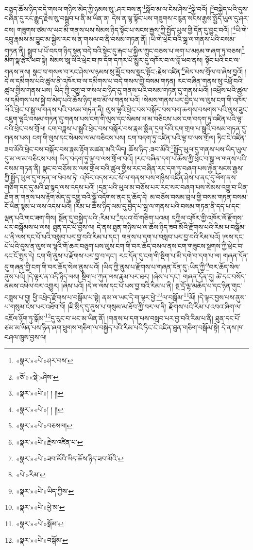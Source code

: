 བཅུད་ཆོས་ཉིད་བདེ་གསལ་གཉིས་མེད་ཀྱི་ཉམས་སུ་:ཤར་བས་ན་\footnote{«སྣར་»«པེ་»ཤར་བས་}སློབ་མ་ལ་ངེས་ཤེས་\footnote{«ཅོ་»«སྡེ་»ཤིས་}སྐྱེ་བའོ། །\footnote{«སྣར་»«པེ་»། ། །།}བསྐྱེད་པའི་དུས་བཞིན་དུ་རང་རྒྱུད་རྗེས་སུ་བསྒྲུབ་པ་ནི་མ་ཡིན་ན། དེས་ན་ལྷ་སྟོང་པས་གཟུགས་བརྙན་སངས་རྒྱས་སྤྱོད་ཡུལ་དུ་ཤར་བས། གཟུགས་ཙམ་ལ་ཡང་མི་གནས་པས་སེམས་ཉིད་སྟོང་པ་སངས་རྒྱས་ཀྱི་སྤྱོད་ཡུལ་གྱི་དོན་དུ་བྱུང་བའོ། །\footnote{«སྣར་»«པེ་»། ། །།}ཡི་གེ་འབྲུ་རྣམས་མ་བྱུང་མ་སྐྱེས་རང་ས་ན་གསལ་བ་ནི་བསམ་གཏན་ནོ། །ཡི་གེ་ཕྲེང་བའི་སྒྲ་ལ་གནས་པའི་བསམ་གཏན་ནི། སྒྲུབ་པ་པོ་བདག་ཉིད་སྟན་བདེ་བའི་སྟེང་དུ་རྐང་པ་སྐྱིལ་ཀྲུང་བཅས་པ་ལག་པ་མཉམ་གཞག་ཏུ་བཅས།\footnote{«སྣར་»«པེ་»བཅསལ།} མིག་སྣ་རྩེར་ཕབ་སྟེ། སེམས་ཨཱ་ལིའི་ཕྲེང་བ་ཁ་དོག་དཀར་པོ་མྱུར་དུ་འཁོར་བ་ལ་བློ་ཕབ་ནས། སྟོང་པའི་ངང་ལ་གནས་ནས། སྣང་བ་གསལ་བ་རང་ཤེས་ལ་ཉམས་སུ་མྱོང་བས་སྣང་སྟོང་:རྗེས་འཛིན་\footnote{«སྣར་»«པེ་»རྗེས་འཛིན་པ་}མེད་པས་གྲོལ་བ་ཞེས་བྱའོ། །དེ་ལ་དམིགས་པའི་ཚུལ་ནི་འཁོར་བ་ལ་དམིགས་པ་བདེ་གསལ་གྱི་བསམ་གཏན། རང་བཞིན་གནས་སུ་འཕྲོ་བའི་ཚུལ་གྱིས་གནས་པས། ཡིད་ཀྱི་འགྱུ་བ་གསལ་བ་ཉིད་དུ་གནས་པའི་བསམ་གཏན་དུ་གནས་པའོ། །འཕྲོས་པའི་ཚུལ་ལ་དམིགས་པས་སྐྱེ་བ་མེད་པའི་ཆོས་ཉིད་ཟབ་མོ་ལ་གནས་པའོ། །སེམས་གནས་པར་བྱེད་པ་ལ་ལུས་ངག་གི་འཁོར་ལོའི་ཕྲེང་བ་སྒྲ་ལ་གནས་པའི་བསམ་གཏན་ནི། ལུས་ལྷའི་ཕྲེང་བས་བསྐོར་བས་བག་ཆགས་བསགས་པའི་ལུས་ཟུང་འཇུག་ལྷའི་བསམ་གཏན་དུ་གནས་པས་ངག་གི་ལུས་དང་སེམས་ལ་མ་བཅིངས་པས་ངག་བདག་ཏུ་འཛིན་པའི་ལྟ་བའི་ཕྲེང་བས་གྲོལ། ངག་བཟླས་པ་སྒྲའི་ཕྲེང་བས་བསྐོར་བས་རྣམ་སྨིན་དྲག་པོའི་ངག་གྲག་པ་སྒྲའི་བསམ་གཏན་དུ་གནས་པས། ངག་གི་ལུས་དང་སེམས་ལ་མ་བཅིངས་པས། ངག་བདག་ཏུ་འཛིན་པའི་ལྟ་བ་ལས་གྲོལ། ཏིང་ངེ་འཛིན་ཟབ་མོའི་ཕྲེང་བས་བསྐོར་བས་རྣམ་རྟོག་མཚན་མའི་ཡིད། ཆོས་ཉིད་:ཟབ་མོའི་\footnote{«སྣར་»«པེ་»ཟབ་མོའི་ཡིད་ཆོས་ཉིད་ཟབ་མོའི་}སྤྱོད་ཡུལ་དུ་གནས་པས་ཡིད་ཡུལ་དུ་མ་ལ་མ་བཅིངས་པས། ཡིད་བདག་ཏུ་ལྟ་བ་ལས་གྲོལ་བའོ། །རང་བཞིན་དག་པ་ཆོས་ཀྱི་ཕྲེང་བ་སྒྲ་ལ་གནས་པའི་བསམ་གཏན་ནི། སྣང་བ་བཅོས་མ་ལས་གྲོལ་བའི་ཚུལ་གྱིས་རང་བཞིན་རང་དག་ཏུ་བཞག་པས་རྐྱེན་སངས་རྒྱས་ཀྱི་སྤྱོད་ཡུལ་དུ་གཏན་ལ་ཕེབས་ཏེ། འཁོར་འདས་རང་སོ་ལ་གནས་པས་གཉིས་འཛིན་ཤེས་པ་ནང་དུ་ལོག་ནས་གཅིག་དང་དུ་མའི་ཐ་སྙད་ལས་འདས་པའོ། །དྲན་པའི་ཡུལ་མ་བཅོས་པར་རང་སར་བཞག་པས་སེམས་འགྱུ་བ་ཡིན་ཐོག་ན་གནས་པས་རྟོག་མེད་དུ་འགྱུ་བའི་སྒྲོ་འདོགས་ནང་དུ་ཆོད་དེ། མ་བཅོས་བསམ་བྲལ་གྱི་བསམ་གཏན་བསམ་ངོ་ཡིན་སྙམ་པ་ལས་འདས་པའོ། །རིམ་པ་ཆོས་ཉིད་ལམ་དུ་བྱེད་པ་སྒྲ་ལ་གནས་པའི་བསམ་གཏན་ནི་དད་པ་དང་ལྡན་པའི་གང་ཟག་གིས། སྔོན་དུ་བསྐྱེད་པའི་:རིམ་པ་\footnote{«པེ་»རིམ་}དཔའ་བོ་གཅིག་པའམ། དཀྱིལ་འཁོར་གྱི་འཁོར་ལོ་རྫོགས་པར་བསྒོམས་པ་ལས། ཐུན་དང་པོ་བྱས་ལ། དེ་ནས་ཐུན་གཉིས་པ་ལ་ཆོས་ཉིད་ཟབ་མོའི་རྫོགས་པའི་རིམ་པ་བསྒོམ་པ་ནི་ལས་དང་པོ་པའི་བསླབ་པར་བྱ་བའི་རིམ་པ་དང་། གནས་པ་དག་པ་བསླབ་པར་བྱ་བའི་རིམ་པའོ། །ལས་དང་པོ་པའི་དུས་ན་ལུས་ལ་ལྷའི་གོ་ཆར་བཅུག་པས་ལུས་ངག་གི་བར་ཆོད་བསལ་ནས་ངག་གཟུངས་སྔགས་ཀྱི་ཕྲེང་བ་དང་ངོ་སྤྲད་དེ། ངག་གི་ནུས་པ་རྫོགས་པར་བྱ་བ་དང་། རང་དོན་དུ་ངག་གི་སྡིག་པ་མི་དགེ་བ་དག་པ་ལ། གཞན་དོན་དུ་གཞན་གྱི་ངག་གི་བར་ཆོད་སེལ་ནུས་པའོ། །ཡིད་ཀྱི་ནུས་པ་རྫོགས་པ་གཞན་དོན་དུ་:ཡིད་ཀྱི་\footnote{«སྣར་»«པེ་»ཡིད་ཀྱིས་}བར་ཆོད་སེལ་ནུས་པའོ། །དེ་ལྟར་ན་འདི་ཉིད་ལས། སྡིག་པ་ཀུན་ལས་རྣམ་པར་ཐར། །ཞེས་པ་དང་། གཞན་དོན་དུ། ཚེ་དང་བསོད་ནམས་འཕེལ་བར་འགྱུར། །ཞེས་པའོ། །དེ་ལ་ལས་དང་པོ་པས་བྱ་བའི་རིམ་པ་ནི། སྔ་དྲོ་ལྷ་མཆོད་པ་དང་ཉིན་གུང་བཟླས་པ་བྱ། ཕྱི་འཕྲེད་རྫོགས་པ་བསྒོམ་པ་སྟེ། ནམ་ལ་ཡང་དེ་ག་ལྟར་ཕྱེ་\footnote{«སྣར་»«པེ་»ཕྱེ་མ་}ལ་བསྒོམ་\footnote{«སྣར་»«པེ་»སྒོམ་}མོ། །དེ་ལྟར་བྱས་པས་ནུས་པ་གསུམ་ངེས་པར་འཐོབ་བོ། །ཇི་སྲིད་དུ་ནུས་པ་གསུམ་མ་ཐོབ་ཀྱི་བར་ལ་ནི། རྫོགས་པའི་རིམ་པ་འབའ་ཞིག་ལ་འཇོལ་ཉོག་ཏུ་སྒོམ་\footnote{«སྣར་»«པེ་»བསྒོམ་}དུ་རུང་བ་ཡང་མ་ཡིན་ནོ། །གནས་པ་དག་པས་བསླབ་པར་བྱ་བའི་རིམ་པ་ནི། ཐུན་དང་པོ་ཙམ་མ་ཡིན་པས་ཉིན་ཞག་ཕྲུགས་གཅིག་ལ་བསྐྱེད་པའི་རིམ་པའི་ཏིང་ངེ་འཛིན་ཐུན་གཅིག་བསྒོམ་སྟེ། དེ་ནས་ཁ་བཤལ་ཁྲུས་བྱས་ལ། 